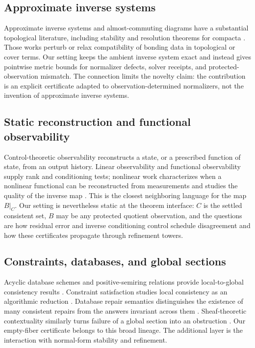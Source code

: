 \documentclass[11pt]{article}
\theoremstyle{definition}
\theoremstyle{remark}
\numberwithin{equation}{section}
\begin{document}
\subsection{Approximate inverse systems}

Approximate inverse systems and almost-commuting diagrams have a substantial
topological literature, including stability and resolution theorems for
compacta \citep{MardesicSegal1989,MardesicRubin1989,Mardesic1993}.  Those
works perturb or relax compatibility of bonding data in topological or cover
terms.  Our setting keeps the ambient inverse system exact and instead gives
pointwise metric bounds for normalizer defects, solver receipts, and
protected-observation mismatch.  The connection limits the novelty claim:
the contribution is an explicit certificate adapted to
observation-determined normalizers, not the invention of approximate inverse
systems.

\subsection{Static reconstruction and functional observability}

Control-theoretic observability reconstructs a state, or a prescribed function of state, from an output history.  Linear observability and functional observability supply rank and conditioning tests; nonlinear work characterizes when a nonlinear functional can be reconstructed from measurements and studies the quality of the inverse map \citep{Kailath1980,MontanariEtAl2023,Kravaris2024}.  This is the closest neighboring language for the map $B|_C$.  Our setting is nevertheless static at the theorem interface: $C$ is the settled consistent set, $B$ may be any protected quotient observation, and the questions are how residual error and inverse conditioning control schedule disagreement and how these certificates propagate through refinement towers.

\subsection{Constraints, databases, and global sections}

Acyclic database schemes and positive-semiring relations provide local-to-global consistency results \citep{BeeriEtAl1983,AtseriasKolaitis2020}.  Constraint satisfaction studies local consistency as an algorithmic reduction \citep{DalmauOprsal2023}.  Database repair semantics distinguishes the existence of many consistent repairs from the answers invariant across them \citep{ArenasBertossiChomicki1999}.  Sheaf-theoretic contextuality similarly turns failure of a global section into an obstruction \citep{AbramskyBrandenburger2011}.  Our empty-fiber certificate belongs to this broad lineage.  The additional layer is the interaction with normal-form stability and refinement.
\end{document}
